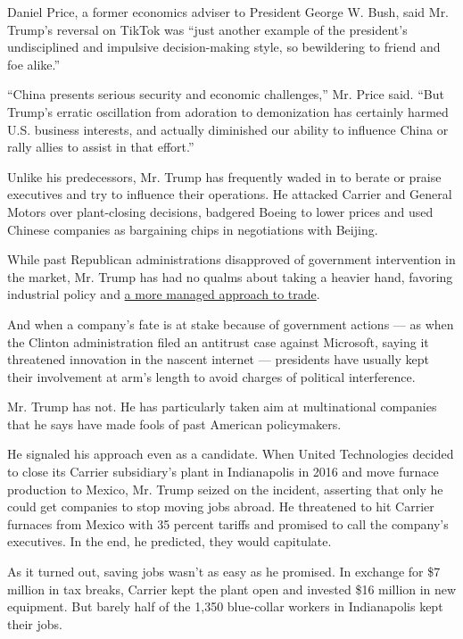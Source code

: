 Daniel Price, a former economics adviser to President George W. Bush,
said Mr. Trump's reversal on TikTok was ``just another example of the
president's undisciplined and impulsive decision-making style, so
bewildering to friend and foe alike.''

``China presents serious security and economic challenges,'' Mr. Price
said. ``But Trump's erratic oscillation from adoration to demonization
has certainly harmed U.S. business interests, and actually diminished
our ability to influence China or rally allies to assist in that
effort.''

Unlike his predecessors, Mr. Trump has frequently waded in to berate or
praise executives and try to influence their operations. He attacked
Carrier and General Motors over plant-closing decisions, badgered Boeing
to lower prices and used Chinese companies as bargaining chips in
negotiations with Beijing.

While past Republican administrations disapproved of government
intervention in the market, Mr. Trump has had no qualms about taking a
heavier hand, favoring industrial policy and
\href{https://www.nytimes3xbfgragh.onion/2019/12/17/business/trump-trade-deals-free-markets.html}{a
more managed approach to trade}.

And when a company's fate is at stake because of government actions ---
as when the Clinton administration filed an antitrust case against
Microsoft, saying it threatened innovation in the nascent internet ---
presidents have usually kept their involvement at arm's length to avoid
charges of political interference.

Mr. Trump has not. He has particularly taken aim at multinational
companies that he says have made fools of past American policymakers.

He signaled his approach even as a candidate. When United Technologies
decided to close its Carrier subsidiary's plant in Indianapolis in 2016
and move furnace production to Mexico, Mr. Trump seized on the incident,
asserting that only he could get companies to stop moving jobs abroad.
He threatened to hit Carrier furnaces from Mexico with 35 percent
tariffs and promised to call the company's executives. In the end, he
predicted, they would capitulate.

As it turned out, saving jobs wasn't as easy as he promised. In exchange
for \$7 million in tax breaks, Carrier kept the plant open and invested
\$16 million in new equipment. But barely half of the 1,350 blue-collar
workers in Indianapolis kept their jobs.

